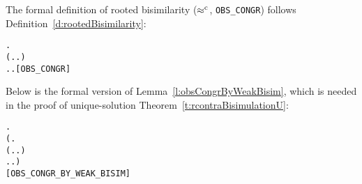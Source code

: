 The formal definition of rooted bisimilarity ($\mathrel{\approx^{\rm{c}}}$, \texttt{OBS_CONGR}) 
follows Definition~\ref{d:rootedBisimilarity}:
\begin{alltt}
 \HOLSymConst{\HOLTokenObsCongr}  \HOLSymConst{\HOLTokenDefEquality{}}
  \HOLSymConst{\HOLTokenForall{}}.
      (\HOLSymConst{\HOLTokenForall{}}.  \HOLTokenTransBegin{}\HOLTokenTransEnd {} \HOLSymConst{\HOLTokenImp{}} \HOLSymConst{\HOLTokenExists{}}.  \HOLTokenWeakTransBegin{}\HOLTokenWeakTransEnd {} \HOLSymConst{\HOLTokenConj{}}  \HOLSymConst{\HOLTokenWeakEQ} ) \HOLSymConst{\HOLTokenConj{}}
      \HOLSymConst{\HOLTokenForall{}}.  \HOLTokenTransBegin{}\HOLTokenTransEnd {} \HOLSymConst{\HOLTokenImp{}} \HOLSymConst{\HOLTokenExists{}}.  \HOLTokenWeakTransBegin{}\HOLTokenWeakTransEnd {} \HOLSymConst{\HOLTokenConj{}}  \HOLSymConst{\HOLTokenWeakEQ} \hfill{[OBS_CONGR]}
\end{alltt}
Below is the formal version of Lemma~\ref{l:obsCongrByWeakBisim}, which is needed in the proof
of unique-solution Theorem~\ref{t:rcontraBisimulationU}:
\begin{alltt}
\HOLTokenTurnstile{}   \HOLSymConst{\HOLTokenImp{}}
   \HOLSymConst{\HOLTokenForall{}} .
       (\HOLSymConst{\HOLTokenForall{}}.
            (\HOLSymConst{\HOLTokenForall{}}.  \HOLTokenTransBegin{}\HOLTokenTransEnd {} \HOLSymConst{\HOLTokenImp{}} \HOLSymConst{\HOLTokenExists{}}.  \HOLTokenWeakTransBegin{}\HOLTokenWeakTransEnd {} \HOLSymConst{\HOLTokenConj{}}   ) \HOLSymConst{\HOLTokenConj{}}
            \HOLSymConst{\HOLTokenForall{}}.  \HOLTokenTransBegin{}\HOLTokenTransEnd {} \HOLSymConst{\HOLTokenImp{}} \HOLSymConst{\HOLTokenExists{}}.  \HOLTokenWeakTransBegin{}\HOLTokenWeakTransEnd {} \HOLSymConst{\HOLTokenConj{}}   ) \HOLSymConst{\HOLTokenImp{}}
        \HOLSymConst{\HOLTokenObsCongr} \hfill{[OBS_CONGR_BY_WEAK_BISIM]}
\end{alltt}

